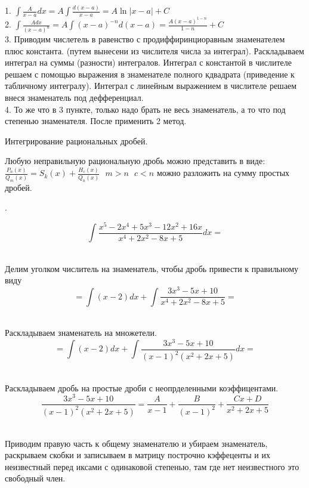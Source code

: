 1. $\int \frac{A}{x-a}dx = A\int \frac{d(x-a)}{x-a} = A\ln|x-a| + C$\\
2. $\int \frac{Adx}{(x-a)^n} = A\int (x-a)^{-n}d(x-a)
  = \frac{A(x-a)^{1-n}}{1-n} + C$\\
3. Приводим числетель в равенство с продиффиринциоравным знаменателем плюс
  константа. (путем вынесени из числителя числа за интеграл).
  Раскладываем интеграл на суммы (разности) интегралов. Интеграл с константой
  в числителе решаем с помощью выражения в знаменателе полного кдвадрата
  (приведение к табличному интегралу). Интеграл с линейным выражением
  в числителе решаем внеся знаменатель под дефференциал.\\
4. То же что в 3 пункте, только надо брать не весь знаменатель, а то что под
  степенью знаменателя. После применить 2 метод.\\

\begin{title}[\Large]
  Интегрирование рациональных дробей.
\end{title}
Любую неправильную рациональную дробь можно представить в виде:\\
$\frac{P_n(x)}{Q_m(x)} = S_k(x) + \frac{H_c(x)}{Q_n(x)} ~~~ m>n ~~~ c < n$
можно разложить на сумму простых дробей.

\begin{center}
  .\\
\end{center}

\[\int \frac{x^5 - 2x^4 + 5x^3 - 12x^2 + 16x}{x^4 + 2x^2 - 8x + 5} dx = \]

\\
Делим уголком числитель на знаменатель, чтобы дробь привести к правильному виду
\[= \int (x - 2)dx + \int \frac{3x^3 - 5x + 10}{x^4 + 2x^2 - 8x + 5} = \]

\\
Раскладываем знаменатель на множетели.
\[= \int (x - 2)dx + \int \frac{3x^3 - 5x + 10}{(x-1)^2 (x^2+2x+5)} dx = \]

\\
Раскладываем дробь на простые дроби с неопрделенными коэффицентами.
\[
  \frac{3x^3 - 5x + 10}{(x-1)^2 (x^2+2x+5)} = \frac{A}{x - 1} +
  \frac{B}{(x - 1)^2} + \frac{Cx + D}{x^2 + 2x + 5}
\]

\\
Приводим правую часть к общему знаменателю и убираем знаменатель, раскрываем
скобки и записываем в матрицу построчно кэффеценты и их неизвестный перед
иксами с одинаковой степенью, там где нет неизвестного это свободный член.\\

